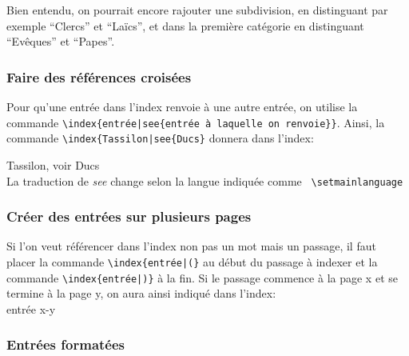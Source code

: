 Bien entendu, on pourrait encore rajouter une subdivision, en distinguant par exemple \enquote{Clercs} et \enquote{Laïcs}, et dans la première catégorie en distinguant \enquote{Evêques} et \enquote{Papes}. 

 
\subsubsection{Faire des références croisées}

Pour qu'une entrée dans l'index renvoie à une autre entrée, on utilise la commande  \verb+\index{entrée|see{entrée à laquelle on renvoie}}+. Ainsi, la commande \verb+\index{Tassilon|see{Ducs}+ donnera dans l'index:

Tassilon, voir Ducs\\
La traduction de \emph{see} change selon la langue indiquée comme \verb+ \setmainlanguage+



  

\subsubsection{Créer des entrées sur plusieurs pages}

Si l'on veut référencer dans l'index non pas un mot mais un passage, il faut placer la commande \verb+\index{entrée|(}+ au début du passage à indexer et la commande  \verb+\index{entrée|)}+ à la fin. Si le passage commence à la page x et se termine à la page y, on aura ainsi indiqué dans l'index: \\
entrée x-y


\subsubsection{Entrées formatées}

